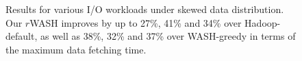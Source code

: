 \documentclass[conference]{IEEEtran}
\begin{document}
\begin{figure}[!t]
	\centering
	\quad\quad %
	\quad\quad
	\vspace{-1ex}
	\caption{Results for various I/O workloads under skewed data distribution. Our $r$WASH improves by up to 27\%, 41\% and 34\% over Hadoop-default, as well as 38\%, 32\% and 37\% over WASH-greedy in terms of the maximum data fetching time.
	}
	\label{Fig:unbalance}
	\vspace{-0.35cm}
\end{figure}

\end{document}

